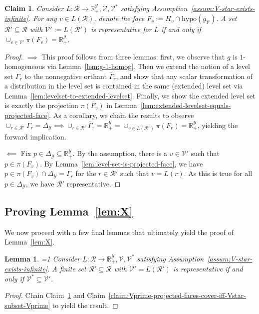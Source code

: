 \documentclass[11pt]{article}
\newcommand{\Comments}{1}
\newcommand{\mynote}[2]{\ifnum\Comments=1\textcolor{#1}{#2}\fi}
\newcommand{\mytodo}[2]{\ifnum\Comments=1%
  \todo[linecolor=#1!80!black,backgroundcolor=#1,bordercolor=#1!80!black]{#2}\fi}
\newcommand{\raf}[1]{\mynote{darkgreen}{[RF: #1]}}
\newcommand{\btw}[1]{\mytodo{gray!20!white}{BTW: #1}}%
\newcommand{\reals}{\mathbb{R}}
\newcommand{\simplex}{\Delta_\Y}
\newcommand{\R}{\mathcal{R}}
\newcommand{\V}{\mathcal{V}}
\newcommand{\Y}{\mathcal{Y}}
\newcommand{\hyp}{\mathrm{hypo}}
\newtheorem{lemma}{Lemma}
\newtheorem{claim}{Claim}
\begin{document}
\begin{claim}\label{claim:projected-faces-cover-RY-iff-representative}
	Consider $L : \R \to \reals^\Y_+, \V, \V^*$ satisfying Assumption~\ref{assum:V-star-exists-infinite}.
	For any $v \in L(\R)$, denote the face $F_v := H_v \cap \hyp(g_\V)$.
	A set $\R' \subseteq \R$ with $\V' := L(\R')$ is representative for $L$ if and only if $\cup_{v \in \V'} \pi(F_v) = \reals^\Y_+$.  
\end{claim}
\begin{proof}
	$\implies$
	This proof follows from three lemmas: first, we observe that $g$ is $1$-homogeneous via Lemma~\ref{lem:g-1-homog}.
	Then we extend the notion of a level set $\Gamma_r$ to the nonnegative orthant $\bar \Gamma_r$, and show that any scalar transformation of a distribution in the level set is contained in the same (extended) level set via Lemma~\ref{lem:levelset-to-extended-levelset}.
	Finally, we show the extended level set is exactly the projection $\pi(F_v)$ in Lemma~\ref{lem:extended-levelset-equals-projected-face}.
	As a corollary, we chain the results to observe $\cup_{r \in \R'} \Gamma_r = \simplex \implies \cup_{r \in \R'} \bar \Gamma_r = \reals_+^\Y = \cup_{v \in L(\R')}\pi(F_v) = \reals^\Y_+$, yielding the forward implication.
	
	
	$\impliedby$
	Fix $p \in \simplex \subseteq \reals^\Y_+$.
	By the assumption, there is a $v \in \V'$ such that $p \in \pi(F_v)$.
	By Lemma~\ref{lem:level-set-is-projected-face}, we have $p \in \pi(F_v) \cap \simplex = \Gamma_r$ for the $r \in \R'$ such that $v = L(r)$.
	As this is true for all $p \in \simplex$, we have $\R'$ representative.
	
	
\end{proof}

\subsection{Proving Lemma~\ref{lem:X}}\label{subsec:lem-X-proof}
We now proceed with a few final lemmas that ultimately yield the proof of Lemma~\ref{lem:X}.

\begin{lemma}\label{lem:lemX1-rep-iff-subset-vectors}
	\btw{(1)}
	Consider $L : \R \to \reals^\Y_+, \V, \V^*$ satisfying Assumption~\ref{assum:V-star-exists-infinite}.
	A finite set $\R' \subseteq \R$ with $\V' = L(\R')$ is representative if and only if $\V^* \subseteq \V'$.
\end{lemma}
\begin{proof}
	Chain Claim~\ref{claim:projected-faces-cover-RY-iff-representative} and Claim~\ref{claim:Vprime-projected-faces-cover-iff-Vstar-subset-Vprime} to yield the result.
\end{proof}
\end{document}
